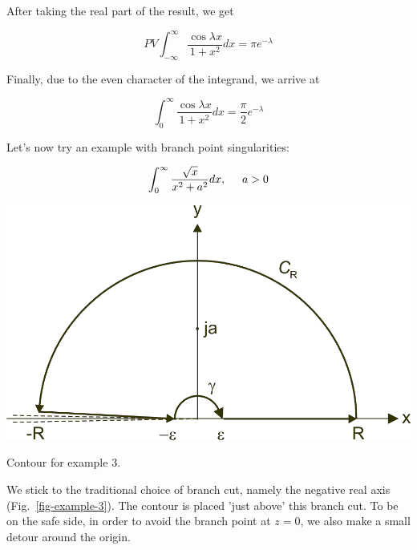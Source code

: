 \noindent{}After taking the real part of the result, we get

\begin{equation}
PV \int_{-\infty}^{\infty}\frac{\cos \lambda x}{1 + x^2} dx = \pi e^{-\lambda}
\end{equation}

Finally, due to the even character of the integrand, we arrive at

\begin{equation}
\int_0^{\infty}\frac{\cos \lambda x}{1 + x^2} dx = \frac{\pi}{2} e^{-\lambda}
\end{equation}

\pagebreak


Let's now try an example with branch point singularities:

\begin{equation}
\int_0^{\infty}\frac{\sqrt{x}}{x^2+a^2}dx, \hspace{0.5cm} a > 0
\end{equation}

\begin{marginfigure}[-0.9cm]
\centering
\includegraphics{complex/figures/int_ex_3}
\caption{Contour for example 3.}
\label{fig-example-3}
\end{marginfigure}

We stick to the traditional choice of branch cut, namely the negative real axis (Fig.~\ref{fig-example-3}). The contour is placed 'just above' this branch cut. To be on the safe side, in order to avoid the branch point at $z=0$, we also make a small detour around the origin.


